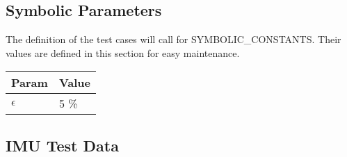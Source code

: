 \documentclass[12pt, titlepage]{article}
\begin{document}

\subsection{Symbolic Parameters}

The definition of the test cases will call for SYMBOLIC\_CONSTANTS. Their values are defined in this
section for easy maintenance.

\begin{table}[h]
    \centering
    \begin{tabular}{|l|l|}
    \hline
    \textbf{Param} & \textbf{Value} \\ \hline
    $\epsilon$     &      5 \%          \\ \hline
    \end{tabular}
    \end{table}





\subsection{IMU Test Data} \label{sec:imu_data}
\end{document}
